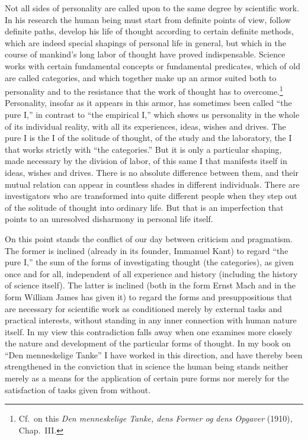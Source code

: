 \documentclass[12pt]{article}
\newcommand{\opage}[1]{\marginnote{\footnotesize\textit{[#1]}}}
\begin{document}
Not all sides of personality are called upon to the same degree by scientific
work. In his research the human being must start from definite points of view,
follow definite paths, develop his life of thought according to certain definite
methods, which are indeed special shapings of personal life in general, but which
in the course of mankind's long labor of thought have proved indispensable.
Science works with certain fundamental concepts or fundamental predicates, which
of old are called categories, and which together make up an armor suited both to
personality and to the resistance that the work of thought has to
overcome.\footnote{Cf.\ on this \textit{Den menneskelige Tanke, dens Former og
dens Opgaver} (1910), Chap.~III.} Personality, insofar as it appears in this
armor, has sometimes been called ``the pure I,'' in contrast to ``the empirical
I,'' which shows us personality in the whole of its individual reality, with all
its experiences, ideas, wishes and drives. The pure I is the I of the solitude
of thought, of the study
\opage{14}%
and the laboratory, the I that works strictly with ``the categories.'' But it is
only a particular shaping, made necessary by the division of labor, of this same
I that manifests itself in ideas, wishes and drives. There is no absolute
difference between them, and their mutual relation can appear in countless
shades in different individuals. There are investigators who are transformed
into quite different people when they step out of the solitude of thought into
ordinary life. But that is an imperfection that points to an unresolved
disharmony in personal life itself.

On this point stands the conflict of our day between criticism and pragmatism.
The former is inclined (already in its founder, Immanuel Kant) to regard ``the
pure I,'' the sum of the forms of investigating thought (the categories), as
given once and for all, independent of all experience and history (including the
history of science itself). The latter is inclined (both in the form Ernst Mach
and in the form William James has given it) to regard the forms and
presuppositions that are necessary for scientific work as conditioned merely by
external tasks and
\opage{15}%
practical interests, without standing in any inner connection with human nature
itself. In my view this contradiction falls away when one examines more closely
the nature and development of the particular forms of thought. In my book on
``Den menneskelige Tanke'' I have worked in this direction, and have thereby been
strengthened in the conviction that in science the human being stands neither
merely as a means for the application of certain pure forms nor merely for the
satisfaction of tasks given from without.
\end{document}
